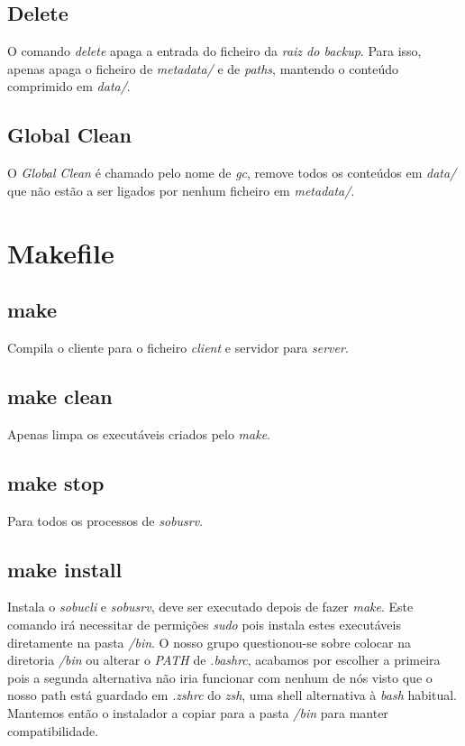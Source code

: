 \documentclass[12pt,a4paper]{report}
\begin{document}
\section{Delete}
O comando \emph{delete} apaga a entrada do ficheiro da \emph{raiz do backup}. Para isso, apenas apaga o ficheiro de \emph{metadata/} e de \emph{paths}, mantendo o conteúdo comprimido em \emph{data/}.

\section{Global Clean}
O \emph{Global Clean} é chamado pelo nome de \emph{gc}, remove todos os conteúdos em \emph{data/} que não estão a ser ligados por nenhum ficheiro em \emph{metadata/}.

\chapter{Makefile}
\section{make}
Compila o cliente para o ficheiro \emph{client} e servidor para \emph{server}.

\section{make clean}
Apenas limpa os executáveis criados pelo \emph{make}.

\section{make stop}
Para todos os processos de \emph{sobusrv}.

\section{make install}
Instala o \emph{sobucli} e \emph{sobusrv}, deve ser executado depois de fazer \emph{make}. Este comando irá necessitar de permições \emph{sudo} pois instala estes executáveis diretamente na pasta \emph{/bin}. O nosso grupo questionou-se sobre colocar na diretoria \emph{/bin} ou alterar o \emph{PATH} de \emph{.bashrc}, acabamos por escolher a primeira pois a segunda alternativa não iria funcionar com nenhum de nós visto que o nosso path está guardado em \emph{.zshrc} do \emph{zsh}, uma shell alternativa à \emph{bash} habitual. Mantemos então o instalador a copiar para a pasta \emph{/bin} para manter compatibilidade.
\end{document}
